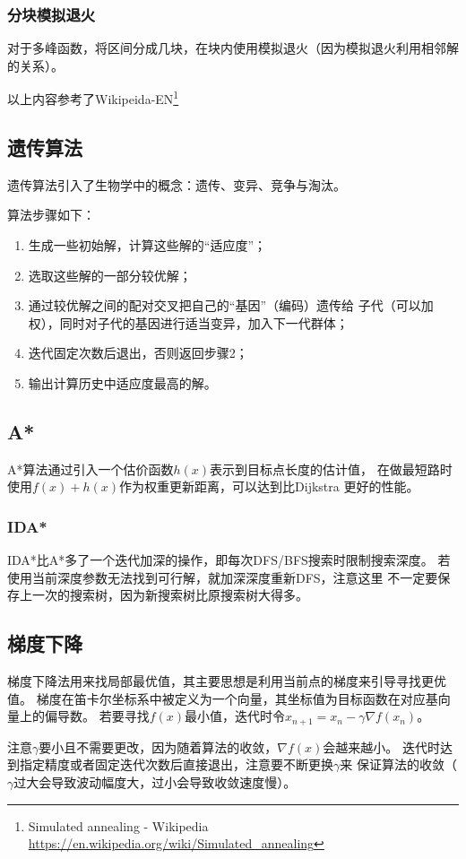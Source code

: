 \subsubsection{分块模拟退火}
对于多峰函数，将区间分成几块，在块内使用模拟退火（因为模拟退火利用相邻解的关系）。

以上内容参考了Wikipeida-EN\footnote{
	Simulated annealing - Wikipedia\\
	\url{https://en.wikipedia.org/wiki/Simulated\_annealing}
}
\subsection{遗传算法}
遗传算法引入了生物学中的概念：遗传、变异、竞争与淘汰。

算法步骤如下：
\begin{enumerate}
	\item 生成一些初始解，计算这些解的``适应度''；
	\item 选取这些解的一部分较优解；
	\item 通过较优解之间的配对交叉把自己的``基因''（编码）遗传给
	      子代（可以加权），同时对子代的基因进行适当变异，加入下一代群体；
	\item 迭代固定次数后退出，否则返回步骤2；
	\item 输出计算历史中适应度最高的解。
\end{enumerate}
\subsection{A*}
A*算法通过引入一个估价函数$h(x)$表示到目标点长度的估计值，
在做最短路时使用$f(x)+h(x)$作为权重更新距离，可以达到比Dijkstra
更好的性能。
\subsubsection{IDA*}
IDA*比A*多了一个迭代加深的操作，即每次DFS/BFS搜索时限制搜索深度。
若使用当前深度参数无法找到可行解，就加深深度重新DFS，注意这里
不一定要保存上一次的搜索树，因为新搜索树比原搜索树大得多。
\subsection{梯度下降}
梯度下降法用来找局部最优值，其主要思想是利用当前点的梯度来引导寻找更优值。
梯度在笛卡尔坐标系中被定义为一个向量，其坐标值为目标函数在对应基向量上的偏导数。
若要寻找$f(x)$最小值，迭代时令$x_{n+1}=x_n-\gamma \nabla f(x_n)$。

注意$\gamma$要小且不需要更改，因为随着算法的收敛，$\nabla f(x)$会越来越小。
迭代时达到指定精度或者固定迭代次数后直接退出，注意要不断更换$\gamma$来
保证算法的收敛（$\gamma$过大会导致波动幅度大，过小会导致收敛速度慢）。

